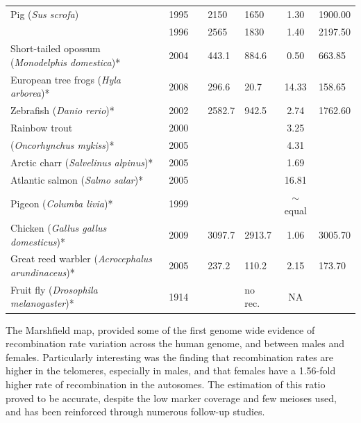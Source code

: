 {\begin{table}[p]
\begin{tabular}{|P{3.2cm}|c|c|p{1.6cm}|p{1.3cm}|c|p{1.7cm}|}
Pig (\textit{Sus scrofa}) & 1995 & \citet{Archibald1995} & 2150 & 1650 & 1.30 & 1900.00 \\
     & 1996 & \citet{Marklund1996} & 2565 & 1830 & 1.40 & 2197.50 \\ \hline
Short-tailed opossum (\textit{Monodelphis domestica})* & 2004 & \citet{Samollow2004} & 443.1 & 884.6 & 0.50 & 663.85 \\ \hline
European tree frogs (\textit{Hyla arborea})* & 2008 & \citet{Berset-Brandli2008} & 296.6 & 20.7 & 14.33 & 158.65 \\ \hline
Zebrafish (\textit{Danio rerio})* & 2002 & \citet{Singer2002} & 2582.7 & 942.5 & 2.74 & 1762.60 \\ \hline
Rainbow trout  & 2000 & \citet{Sakamoto2000} &  &  & 3.25 &  \\
(\textit{Oncorhynchus mykiss})* & 2005 & \citet{Danzmann2005} &  &  & 4.31 &  \\ \hline
Arctic charr (\textit{Salvelinus alpinus})* & 2005 & \citet{Danzmann2005} &  &  & 1.69 &  \\ \hline
Atlantic salmon (\textit{Salmo salar})* & 2005 & \citet{Danzmann2005} &  &  & 16.81 &  \\ \hline
Pigeon (\textit{Columba livia})* & 1999 & \citet{Pigozzi1999} &  &  & $\sim$equal &  \\ \hline
Chicken (\textit{Gallus gallus domesticus})* & 2009 & \citet{Groenen2009} & 3097.7 & 2913.7 & 1.06 & 3005.70 \\ \hline
Great reed warbler (\textit{Acrocephalus arundinaceus})* & 2005 & \citet{Hansson2005} & 237.2 & 110.2 & 2.15 & 173.70 \\ \hline
Fruit fly (\textit{Drosophila melanogaster})* & 1914 & \citet{Morgan1914} &  & no rec. & NA &  \\
    \hline \end{tabular}
\end{table}
\clearpage}


The Marshfield map\cite{Broman1998}, provided some of the first genome wide evidence of recombination rate variation across the human genome, and between males and females.
Particularly interesting was the finding that recombination rates are higher in the telomeres, especially in males, and that females have a 1.56-fold higher rate of recombination in the autosomes.
The estimation of this ratio proved to be accurate, despite the low marker coverage and few meioses used, and has been reinforced through numerous follow-up studies\cite{Broman2000,Kong2002,Coop2008,Kong2010,Bleazard2013,Campbell2015,Bherer2016}. %

